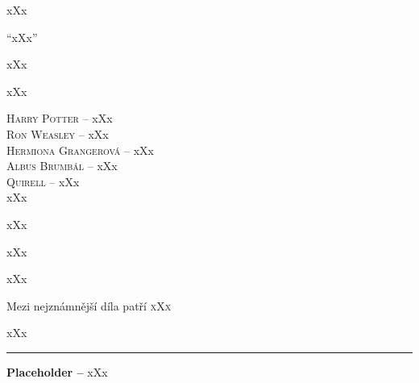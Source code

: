 \documentclass{extarticle} %
\begin{document}

\noindent xXx



\noindent 
\enquote{xXx}

\noindent 
xXx

\noindent 
xXx

\noindent 
\textsc{Harry Potter --} xXx \\
\textsc{Ron Weasley --} xXx \\
\textsc{Hermiona Grangerová --} xXx \\
\textsc{Albus Brumbál --} xXx \\
\textsc{Quirell --} xXx \\

\noindent 
xXx

\noindent 
xXx

\noindent 
xXx






\noindent 
xXx


\noindent 
Mezi nejznámnější díla patří \textsc{xXx}






\noindent 
xXx

\vfill

\noindent\begin{minipage}{\textwidth}
    {\textcolor{\wpagecolor}{\rule{\linewidth}{0.4pt}}
    \footnotesize
    \textbf{Placeholder --} xXx
    }
\end{minipage}
\end{document}
